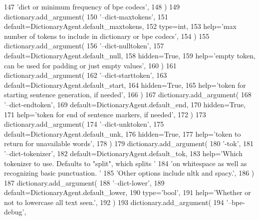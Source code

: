 \begin{DoxyCode}
147             \textcolor{stringliteral}{'dict or minimum frequency of bpe codecs'},
148         )
149         dictionary.add\_argument(
150             \textcolor{stringliteral}{'--dict-maxtokens'},
151             default=DictionaryAgent.default\_maxtokens,
152             type=int,
153             help=\textcolor{stringliteral}{'max number of tokens to include in dictionary or bpe codecs'},
154         )
155         dictionary.add\_argument(
156             \textcolor{stringliteral}{'--dict-nulltoken'},
157             default=DictionaryAgent.default\_null,
158             hidden=\textcolor{keyword}{True},
159             help=\textcolor{stringliteral}{'empty token, can be used for padding or just empty values'},
160         )
161         dictionary.add\_argument(
162             \textcolor{stringliteral}{'--dict-starttoken'},
163             default=DictionaryAgent.default\_start,
164             hidden=\textcolor{keyword}{True},
165             help=\textcolor{stringliteral}{'token for starting sentence generation, if needed'},
166         )
167         dictionary.add\_argument(
168             \textcolor{stringliteral}{'--dict-endtoken'},
169             default=DictionaryAgent.default\_end,
170             hidden=\textcolor{keyword}{True},
171             help=\textcolor{stringliteral}{'token for end of sentence markers, if needed'},
172         )
173         dictionary.add\_argument(
174             \textcolor{stringliteral}{'--dict-unktoken'},
175             default=DictionaryAgent.default\_unk,
176             hidden=\textcolor{keyword}{True},
177             help=\textcolor{stringliteral}{'token to return for unavailable words'},
178         )
179         dictionary.add\_argument(
180             \textcolor{stringliteral}{'-tok'},
181             \textcolor{stringliteral}{'--dict-tokenizer'},
182             default=DictionaryAgent.default\_tok,
183             help=\textcolor{stringliteral}{'Which tokenizer to use. Defaults to "split", which splits '}
184             \textcolor{stringliteral}{'on whitespace as well as recognizing basic punctuation. '}
185             \textcolor{stringliteral}{'Other options include nltk and spacy.'},
186         )
187         dictionary.add\_argument(
188             \textcolor{stringliteral}{'--dict-lower'},
189             default=DictionaryAgent.default\_lower,
190             type=\textcolor{stringliteral}{'bool'},
191             help=\textcolor{stringliteral}{'Whether or not to lowercase all text seen.'},
192         )
193         dictionary.add\_argument(
194             \textcolor{stringliteral}{'--bpe-debug'},

\end{DoxyCode}
